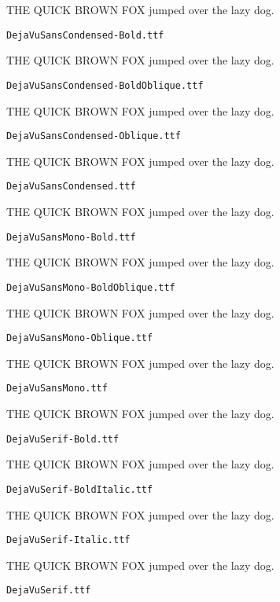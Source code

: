 \documentclass{article}
\begin{document}
THE QUICK BROWN FOX jumped over the lazy dog.

\setmainfont[Extension=.ttf]{DejaVuSansCondensed-Bold}
\noindent \verb!DejaVuSansCondensed-Bold.ttf!

THE QUICK BROWN FOX jumped over the lazy dog.

\setmainfont[Extension=.ttf]{DejaVuSansCondensed-BoldOblique}
\noindent \verb!DejaVuSansCondensed-BoldOblique.ttf!

THE QUICK BROWN FOX jumped over the lazy dog.

\setmainfont[Extension=.ttf]{DejaVuSansCondensed-Oblique}
\noindent \verb!DejaVuSansCondensed-Oblique.ttf!

THE QUICK BROWN FOX jumped over the lazy dog.

\setmainfont[Extension=.ttf]{DejaVuSansCondensed}
\noindent \verb!DejaVuSansCondensed.ttf!

THE QUICK BROWN FOX jumped over the lazy dog.

\setmainfont[Extension=.ttf]{DejaVuSansMono-Bold}
\noindent \verb!DejaVuSansMono-Bold.ttf!

THE QUICK BROWN FOX jumped over the lazy dog.

\setmainfont[Extension=.ttf]{DejaVuSansMono-BoldOblique}
\noindent \verb!DejaVuSansMono-BoldOblique.ttf!

THE QUICK BROWN FOX jumped over the lazy dog.

\setmainfont[Extension=.ttf]{DejaVuSansMono-Oblique}
\noindent \verb!DejaVuSansMono-Oblique.ttf!

THE QUICK BROWN FOX jumped over the lazy dog.

\setmainfont[Extension=.ttf]{DejaVuSansMono}
\noindent \verb!DejaVuSansMono.ttf!

THE QUICK BROWN FOX jumped over the lazy dog.

\setmainfont[Extension=.ttf]{DejaVuSerif-Bold}
\noindent \verb!DejaVuSerif-Bold.ttf!

THE QUICK BROWN FOX jumped over the lazy dog.

\setmainfont[Extension=.ttf]{DejaVuSerif-BoldItalic}
\noindent \verb!DejaVuSerif-BoldItalic.ttf!

THE QUICK BROWN FOX jumped over the lazy dog.

\setmainfont[Extension=.ttf]{DejaVuSerif-Italic}
\noindent \verb!DejaVuSerif-Italic.ttf!

THE QUICK BROWN FOX jumped over the lazy dog.

\setmainfont[Extension=.ttf]{DejaVuSerif}
\noindent \verb!DejaVuSerif.ttf!
\end{document}
